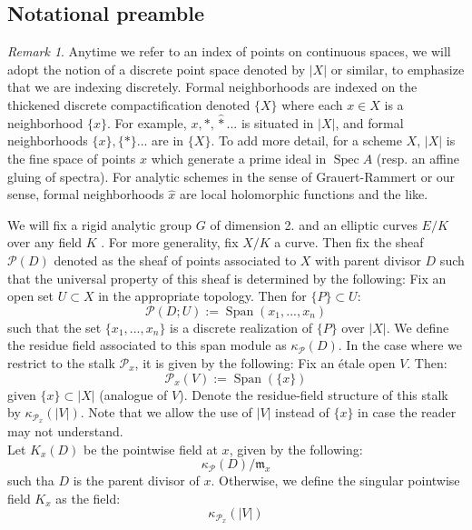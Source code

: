 \documentclass[9pt]{amsart}
\renewcommand{\[}{\begin{equation}}
\renewcommand{\]}{\end{equation}}
\newcommand{\on}{\operatorname}
\theoremstyle{plain}
\theoremstyle{remark}
\newtheorem{rem}[thm]{Remark}
\begin{document}
\subsection{Notational preamble}
\begin{rem} Anytime we refer to an index of points on continuous spaces, we will adopt the notion of a discrete point space denoted by $|X|$ or similar, to emphasize that we are indexing discretely. Formal neighborhoods are indexed on the thickened discrete compactification denoted $\{ X \}$ where each $x \in X$ is a neighborhood $\{x\}$. For example, $x, *, \widehat{*}...$ is situated in $|X|$, and formal neighborhoods $\{x\}, \{*\}...$ are in $\{ X \}$. To add more detail, for a scheme $X$, $|X|$ is the fine space of points $x$ which generate a prime ideal in $\on{Spec} A$ (resp. an affine gluing of spectra). For analytic schemes in the sense of Grauert-Rammert or our sense, formal neighborhoods $\widehat{x}$ are local holomorphic functions and the like.
\end{rem}
 We will fix a rigid analytic group $G$ of dimension 2. and an elliptic curves $E/K$ over any field $K$ . For more generality, fix $X/K$ a curve. Then fix the sheaf $\mathscr{P}(D)$ denoted as the sheaf of points associated to $X$ with parent divisor $D$ such that the universal property of this sheaf is determined by the following: Fix an open set $U \subset X$ in the appropriate topology. Then for $\{P\} \subset U$:
 \[\mathscr{P}(D; U) := \on{Span}(x_1,...,x_n)\] 
 such that the set $\{x_1,...,x_n\}$ is a discrete realization of $\{P\}$ over $|X|$. We define the residue field associated to this span module as $\kappa_{\mathscr{P}}(D)$. In the case where we restrict to the stalk $\mathscr{P}_x$, it is given by the following: Fix an étale open $V$. Then:
 \[\mathscr{P}_x(V) := \on{Span}(\{x\})\] 
 given $\{x\} \subset |X|$ (analogue of $V$). Denote the residue-field structure of this stalk by $\kappa_{\mathscr{P}_x}(|V|)$. Note that we allow the use of $|V|$ instead of $\{x\}$ in case the reader may not understand.\\
Let $K_x(D)$ be the pointwise field at $x$, given by the following:
 \[\kappa_{\mathscr{P}}(D)/\mathfrak{m}_x\]
 such tha $D$ is the parent divisor of $x$. Otherwise, we define the singular pointwise field $K_x$ as the field:
 \[\kappa_{\mathscr{P}_x}(|V|)\]
\end{document}
